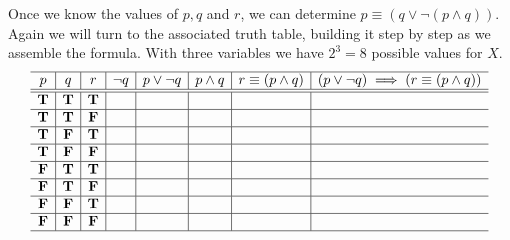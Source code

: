   \begin{example}
Once we know the values of $p, q$ and $r$, we can determine $p\equiv (q \lor \neg(p \land q))$.  Again we will turn to the associated truth table, building it step by step as we assemble the formula. With three variables we have $2^3 = 8$ possible values for $X$.
\[  \begin{array}{c|c|c|c|c|c|c|c}
  \hline  
  p 			& q 				& r				&\neg q&p\lor \neg q	& p \land q&r \equiv ( p \land q)	&(p\lor \neg q) \implies (r \equiv ( p \land q))\\
  \hline
  \hline
 \mathbf{T} &  \mathbf{T} 	&  \mathbf{T} 	&  &   	&  	&  	&  \\
  \hline
 \mathbf{T} &  \mathbf{T} 	&  \mathbf{F}  	& 	&   	&  	&  	&  \\
  \hline
 \mathbf{T} &  \mathbf{F} 	&  \mathbf{T}  	&   	&   	&  	&  	&  \\
  \hline
 \mathbf{T} &  \mathbf{F} 	&  \mathbf{F}  	&   	&   	&  	&  	&  \\
\hline
 \mathbf{F} &  \mathbf{T} 	&  \mathbf{T} 	&   	&   	&  	&  	&  \\
  \hline
 \mathbf{F} &  \mathbf{T} 	&  \mathbf{F}  	&   	&   	&  	&  	&  \\
  \hline
 \mathbf{F} &  \mathbf{F} 	&  \mathbf{T}  	&   	&   	&  	&  	&  \\
  \hline
 \mathbf{F} &  \mathbf{F} 	&  \mathbf{F}  	&   	&   	&  	&  	&  \\
    \hline
    \end{array}\]
    
\ifKey
\color{red}


\end{example}
